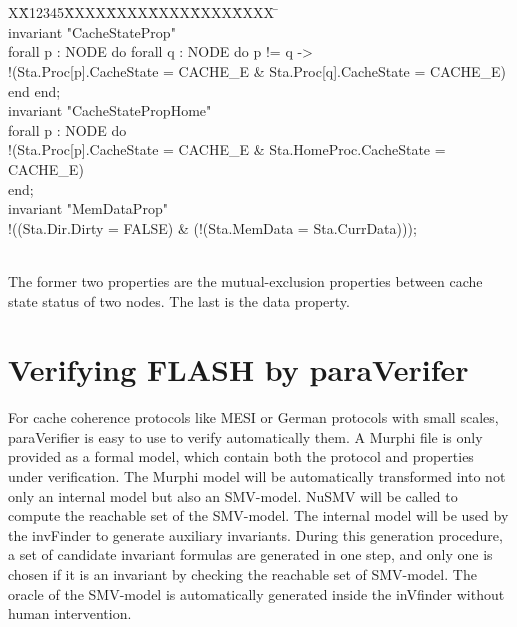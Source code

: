 \documentclass{llncs}
\newlength{\fminilength}
\newenvironment{fmini}[1][\linewidth]
  {\setlength{\fminilength}{#1\fboxsep-2\fboxrule}%
   \vspace{2ex}\noindent\begin{lrbox}{\fminibox}\begin{minipage}{\fminilength}%
   \mbox{ }\hfill\vspace{-2.5ex}}%
  {\end{minipage}\end{lrbox}\vspace{1ex}\hspace{0ex}%
   \framebox{\usebox{\fminibox}}}
\newenvironment{specification}
{\noindent\scriptsize
\tt\begin{fmini}\begin{tabbing}X\=X12345\=XXXX\=XXXX\=XXXX\=XXXX\=XXXX
\=\+\kill} {\end{tabbing}\normalfont\end{fmini}}
\begin{document}
\begin{specification}\\
invariant "CacheStateProp"\\
  forall p : NODE do forall q : NODE do     p != q ->\\
    !(Sta.Proc[p].CacheState = CACHE\_E \& Sta.Proc[q].CacheState = CACHE\_E)\\
  end end;\\

invariant "CacheStatePropHome"\\
  forall p : NODE do\\
    !(Sta.Proc[p].CacheState = CACHE\_E \& Sta.HomeProc.CacheState = CACHE\_E)\\
  end;\\

invariant "MemDataProp"\\
  !((Sta.Dir.Dirty = FALSE) \& (!(Sta.MemData = Sta.CurrData)));\\
\end{specification}\\

The former two properties are the mutual-exclusion properties between  cache state status of two nodes. The last is the  data property.

\section{Verifying FLASH by {\sf paraVerifer} \label{sec:experiments}}
For cache coherence protocols like MESI or German protocols with small scales,   {\sf paraVerifier}  is easy to use to verify automatically them. A Murphi file is only provided as a formal model, which contain both the protocol and properties under verification. The Murphi model will be automatically transformed into not only an internal model but also an SMV-model. NuSMV will be called to compute the reachable set of the SMV-model. The internal model will be used by the {\sf invFinder} to generate auxiliary invariants. During this generation procedure, a set of candidate invariant formulas are generated in one step, and only one is chosen  if it is an invariant by checking the reachable set of   SMV-model. The oracle of the SMV-model is automatically generated inside the {\sf inVfinder} without human intervention.
\end{document}
